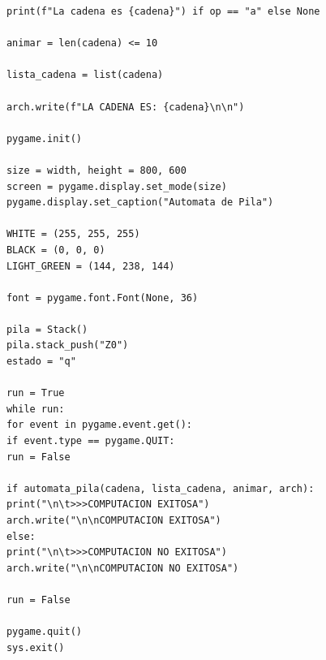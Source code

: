 \documentclass[11pt]{article} %
\begin{document}
\begin{lstlisting}
			print(f"La cadena es {cadena}") if op == "a" else None
			
			animar = len(cadena) <= 10
			
			lista_cadena = list(cadena)
			
			arch.write(f"LA CADENA ES: {cadena}\n\n")
			
			pygame.init()
			
			size = width, height = 800, 600
			screen = pygame.display.set_mode(size)
			pygame.display.set_caption("Automata de Pila")
			
			WHITE = (255, 255, 255)
			BLACK = (0, 0, 0)
			LIGHT_GREEN = (144, 238, 144)
			
			font = pygame.font.Font(None, 36)
			
			pila = Stack()
			pila.stack_push("Z0")
			estado = "q"
			
			run = True
			while run:
			for event in pygame.event.get():
			if event.type == pygame.QUIT:
			run = False
			
			if automata_pila(cadena, lista_cadena, animar, arch):
			print("\n\t>>>COMPUTACION EXITOSA")
			arch.write("\n\nCOMPUTACION EXITOSA")
			else:
			print("\n\t>>>COMPUTACION NO EXITOSA")
			arch.write("\n\nCOMPUTACION NO EXITOSA")
			
			run = False
			
			pygame.quit()
			sys.exit()
		
	
	
	\end{lstlisting}

	
	
\end{document}
